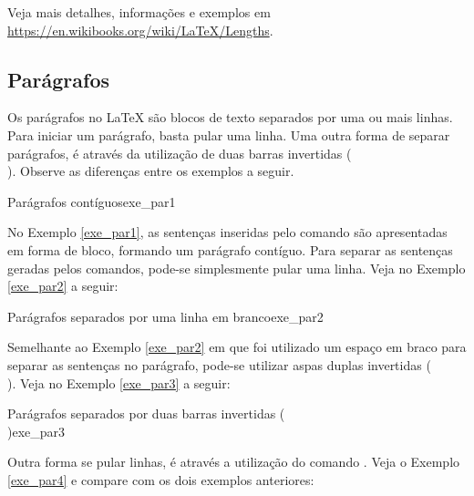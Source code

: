 \begin{marker}
Veja mais detalhes, informações e exemplos em \url{https://en.wikibooks.org/wiki/LaTeX/Lengths}.
\end{marker}

\subsection{Parágrafos}
\label{sec:paragrafos}

Os parágrafos no \LaTeX{} são blocos de texto separados por uma ou mais linhas. Para iniciar um parágrafo, basta pular uma linha. Uma outra forma de separar parágrafos, é através da utilização de duas barras invertidas (\texttt{\\}). Observe as diferenças entre os exemplos a seguir.

\begin{texexptitled}[breakable,enhanced,middle=2mm]{Parágrafos contíguos}{exe_par1}
\lipsumsentence[1-4] 
\lipsumsentence[5-8]
\end{texexptitled}

No Exemplo \ref{exe_par1}, as sentenças inseridas pelo comando \texttt{\lipsumsentence} são apresentadas em forma de bloco, formando um parágrafo contíguo. Para separar as sentenças geradas pelos comandos, pode-se simplesmente pular uma linha. Veja no Exemplo \ref{exe_par2} a seguir:

\begin{texexptitled}[breakable,enhanced,middle=2mm]{Parágrafos separados por uma linha em branco}{exe_par2}
\lipsumsentence[9-12]  

\lipsumsentence[13-16]
\end{texexptitled}

Semelhante ao Exemplo \ref{exe_par2} em que foi utilizado um espaço em braco para separar as sentenças no parágrafo, pode-se utilizar aspas duplas invertidas (\texttt{\\}). Veja no Exemplo \ref{exe_par3} a seguir:

\begin{texexptitled}[breakable,enhanced,middle=2mm]{Parágrafos separados por duas barras invertidas (\texttt{\\})}{exe_par3}
\lipsumsentence[17-20] \\ 
\lipsumsentence[21-24]
\end{texexptitled}

Outra forma se pular linhas, é através a utilização do comando \texttt{\newline}. Veja o Exemplo \ref{exe_par4} e compare com os dois exemplos anteriores:

